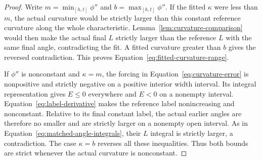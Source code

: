 \begin{proof}
Write $m=\min_{[h,t]}\phi''$ and $b=\max_{[h,t]}\phi''$.
If the fitted $\kappa$ were less than $m$, the actual curvature would
be strictly larger than this constant reference curvature along the
whole characteristic.  Lemma~\ref{lem:curvature-comparison} would
then make the actual final $L$ strictly larger than the reference $L$
with the same final angle, contradicting the fit.  A fitted curvature
greater than $b$ gives the reversed contradiction.  This proves
Equation~\eqref{eq:fitted-curvature-range}.

If $\phi''$ is nonconstant and $\kappa=m$, the forcing in
Equation~\eqref{eq:curvature-error} is nonpositive and strictly
negative on a positive interior width interval.  Its integral
representation gives $E\le0$ everywhere and $E<0$ on a nonempty
interval.  Equation~\eqref{eq:label-derivative} makes the reference
label nonincreasing and nonconstant.  Relative to its final constant
label, the actual earlier angles are therefore no smaller and are
strictly larger on a nonempty open interval.  As in
Equation~\eqref{eq:matched-angle-integrals}, their $L$ integral is
strictly larger, a contradiction.  The case $\kappa=b$ reverses all
these inequalities.  Thus both bounds are strict whenever the
actual curvature is nonconstant.
\end{proof}
